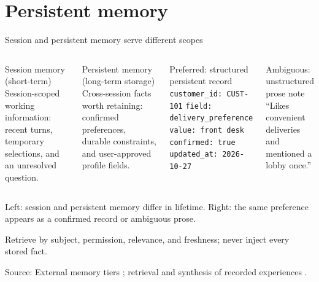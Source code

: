 \documentclass[aspectratio=169]{beamer}
\newcommand{\slidesource}[1]{\par\vfill\noindent\parbox{\linewidth}{\tiny\color{hrgray}\raggedright\sloppy Source: #1}}
\newcommand{\visualdescription}[1]{\par\vspace{.2em}\noindent\parbox{\linewidth}{\centering\tiny\color{hrgray}#1}}
\begin{document}
\section{Persistent memory}

\begin{frame}{Session and persistent memory serve different scopes}
\small
\begin{columns}[T]
\begin{block}{Session memory (short-term)}
Session-scoped working information: recent turns, temporary selections, and an unresolved question.
\end{block}
\begin{block}{Persistent memory (long-term storage)}
Cross-session facts worth retaining: confirmed preferences, durable constraints, and user-approved profile fields.
\end{block}
\begin{block}{Preferred: structured persistent record}
\texttt{customer\_id: CUST-101}\newline
\texttt{field: delivery\_preference}\newline
\texttt{value: front desk}\newline
\texttt{confirmed: true}\newline
\texttt{updated\_at: 2026-10-27}
\end{block}
\begin{alertblock}{Ambiguous: unstructured prose note}
``Likes convenient deliveries and mentioned a lobby once.''
\end{alertblock}
\end{columns}
\visualdescription{Left: session and persistent memory differ in lifetime. Right: the same preference appears as a confirmed record or ambiguous prose.}
\vfill
Retrieve by subject, permission, relevance, and freshness; never inject every stored fact.
\slidesource{External memory tiers \parencite{Packer2023MemGPT}; retrieval and synthesis of recorded experiences \parencite{Park2023GenerativeAgents}.}
\end{frame}
\end{document}
